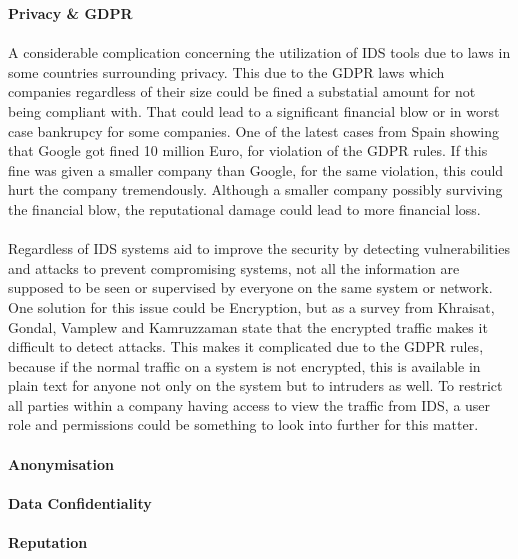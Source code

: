 \textbf{Privacy \& GDPR}\\
\\
A considerable complication concerning the utilization of IDS tools due to laws in some countries surrounding privacy. This due to the GDPR laws which companies regardless of their size could be fined a substatial amount for not being compliant with. That could lead to a significant financial blow or in worst case bankrupcy for some companies. One of the latest cases from Spain showing that Google got fined 10 million Euro, for violation of the GDPR rules.\cite{Enforcementtracker.com} If this fine was given a smaller company than Google, for the same violation, this could hurt the company tremendously. Although a smaller company possibly surviving the financial blow, the reputational damage could lead to more financial loss.\\
\\
Regardless of IDS systems aid to improve the security by detecting vulnerabilities and attacks to prevent compromising systems, not all the information are supposed to be seen or supervised by everyone on the same system or network. One solution for this issue could be Encryption, but as a survey from Khraisat, Gondal, Vamplew and Kamruzzaman state that the encrypted traffic makes it difficult to detect attacks. \cite{Khraisat2019} This makes it complicated due to the GDPR rules, because if the normal traffic on a system is not encrypted, this is available in plain text for anyone not only on the system but to intruders as well. To restrict all parties within a company having access to view the traffic from IDS, a user role and permissions could be something to look into further for this matter.\\
\\
\textbf{Anonymisation}\\
\\
\textbf{Data Confidentiality}\\
\\
\textbf{Reputation}\\
